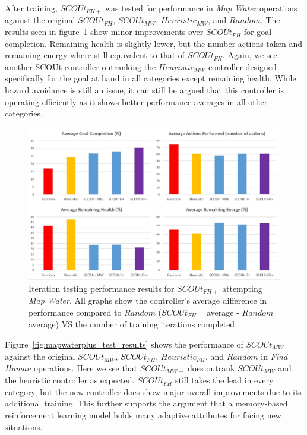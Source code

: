 After training, $SCOUt_{FH+}$ was tested for performance in \textit{Map Water} operations against the original $SCOUt_{FH}$, $SCOUt_{MW}$, $Heuristic_{MW}$, and $Random$.
The results seen in figure~\ref{fig:findhumanplus_test_results} show minor improvements over $SCOUt_{FH}$ for goal completion.
Remaining health is slightly lower, but the number actions taken and remaining energy where still equivalent to that of $SCOUt_{FH}$.
Again, we see another SCOUt controller outranking the $Heuristic_{MW}$ controller designed specifically for the goal at hand in all categories except remaining health.
While hazard avoidance is still an issue, it can still be argued that this controller is operating efficiently as it shows better performance averages in all other categories.

\begin{figure}[!htb]
  \centering
  \includegraphics[width=1.0\columnwidth]{Figures/Results/Experiment2/AdditionalTraining/FindHumanPlus.JPG}
  \caption[Experiment 2 - Additional Training Testing Results: $SCOUt_{FH+}$]{Iteration testing performance results for $SCOUt_{FH+}$ attempting \textit{Map Water}. All graphs show the controller's average difference in performance compared to $Random$ ($SCOUt_{FH+}$ average - $Random$ average) VS the number of training iterations completed.}
  \label{fig:findhumanplus_test_results}
\end{figure}


Figure~\ref{fig:mapwaterplus_test_results} shows the performance of $SCOUt_{MW+}$ against the original $SCOUt_{MW}$, $SCOUt_{FH}$, $Heuristic_{FH}$, and $Random$ in \textit{Find Human} operations.
Here we see that $SCOUt_{MW+}$ does outrank $SCOUt_{MW}$ and the heuristic controller as expected.
$SCOUt_{FH}$ still takes the lead in every category, but the new controller does show major overall improvements due to its additional training.
This further supports the argument that a memory-based reinforcement learning model holds many adaptive attributes for facing new situations.


